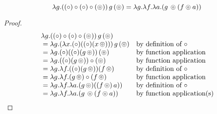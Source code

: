 \begin{lemma}\label{lemma:appl_comp_law}
$$
\lambda g . ((\circ) \circ (\circ) \circ (\circledcirc))\, g\, (\circledcirc) = \lambda g . \lambda f . \lambda a . (g\, \circledcirc (f \circledcirc a))
$$
\end{lemma}
\begin{proof}
$$
\begin{array}{ll}
\lambda g . ((\circ) \circ (\circ) \circ (\circledcirc))\, g\, (\circledcirc) \\
{}= \lambda g . (\lambda x . (\circ) ((\circ) (x\, \circledcirc)))\, g\, (\circledcirc)
 &\mbox{by definition of }\circ\\
{}= \lambda g . (\circ) ((\circ) (g\, \circledcirc))\, (\circledcirc) 
& \mbox{by function application}\\
{}= \lambda g . ((\circ) (g\, \circledcirc)) \circ (\circledcirc) 
& \mbox{by function application}\\
{}= \lambda g . \lambda f . ((\circ) (g\, \circledcirc)) (f\, \circledcirc) 
 &\mbox{by definition of }\circ\\
{}= \lambda g . \lambda f . (g\, \circledcirc) \circ (f\, \circledcirc)
& \mbox{by function application}\\
{}= \lambda g . \lambda f . \lambda a . (g\, \circledcirc) ((f\, \circledcirc)\, a) ) 
& \mbox{by definition of }\circ\\
{}= \lambda g . \lambda f . \lambda a . (g\, \circledcirc (f \circledcirc a))
& \mbox{by function application(s)}\\
\end{array}
$$
\end{proof}

